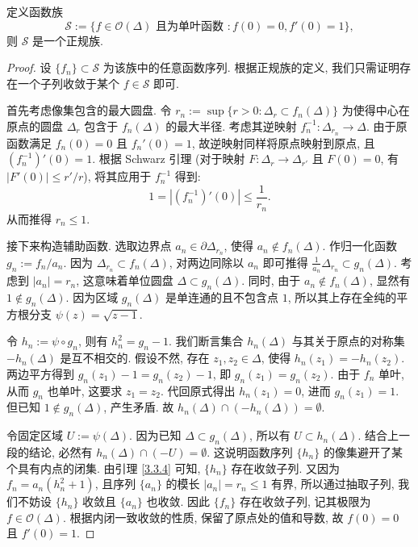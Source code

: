 \begin{lemma}[Kobe 引理]\label{3.3.5}
定义函数族
\[ \mathcal{S} := \{f \in \mathcal{O}(\Delta) \text{ 且为单叶函数 } : f(0)=0, f'(0)=1\}, \]
则 $\mathcal{S}$ 是一个正规族.
\end{lemma}

\begin{proof}
设 $\{f_n\} \subset \mathcal{S}$ 为该族中的任意函数序列. 根据正规族的定义, 我们只需证明存在一个子列收敛于某个 $f \in \mathcal{S}$ 即可. 

首先考虑像集包含的最大圆盘. 令 $r_n := \sup\{r > 0 : \Delta_r \subset f_n(\Delta)\}$ 为使得中心在原点的圆盘 $\Delta_r$ 包含于 $f_n(\Delta)$ 的最大半径. 考虑其逆映射 $f_n^{-1} : \Delta_{r_n} \to \Delta$. 由于原函数满足 $f_n(0)=0$ 且 $f_n'(0)=1$, 故逆映射同样将原点映射到原点, 且 $(f_n^{-1})'(0) = 1$. 根据 Schwarz 引理 (对于映射 $F: \Delta_r \to \Delta_{r'}$ 且 $F(0)=0$, 有 $|F'(0)| \leqslant r'/r$), 将其应用于 $f_n^{-1}$ 得到:
\[ 1 = |(f_n^{-1})'(0)| \leqslant \frac{1}{r_n}. \]
从而推得 $r_n \leqslant 1$.

接下来构造辅助函数. 选取边界点 $a_n \in \partial \Delta_{r_n}$, 使得 $a_n \notin f_n(\Delta)$. 作归一化函数 $g_n := f_n/a_n$. 因为 $\Delta_{r_n} \subset f_n(\Delta)$, 对两边同除以 $a_n$ 即可推得 $\frac{1}{a_n}\Delta_{r_n} \subset g_n(\Delta)$. 考虑到 $|a_n| = r_n$, 这意味着单位圆盘 $\Delta \subset g_n(\Delta)$. 同时, 由于 $a_n \notin f_n(\Delta)$, 显然有 $1 \notin g_n(\Delta)$. 因为区域 $g_n(\Delta)$ 是单连通的且不包含点 $1$, 所以其上存在全纯的平方根分支 $\psi(z) = \sqrt{z-1}$.

令 $h_n := \psi \circ g_n$, 则有 $h_n^2 = g_n - 1$. 我们断言集合 $h_n(\Delta)$ 与其关于原点的对称集 $-h_n(\Delta)$ 是互不相交的. 假设不然, 存在 $z_1, z_2 \in \Delta$, 使得 $h_n(z_1) = -h_n(z_2)$. 两边平方得到 $g_n(z_1) - 1 = g_n(z_2) - 1$, 即 $g_n(z_1) = g_n(z_2)$. 由于 $f_n$ 单叶, 从而 $g_n$ 也单叶, 这要求 $z_1 = z_2$. 代回原式得出 $h_n(z_1) = 0$, 进而 $g_n(z_1) = 1$. 但已知 $1 \notin g_n(\Delta)$, 产生矛盾. 故 $h_n(\Delta) \cap (-h_n(\Delta)) = \emptyset$.

令固定区域 $U := \psi(\Delta)$. 因为已知 $\Delta \subset g_n(\Delta)$, 所以有 $U \subset h_n(\Delta)$. 结合上一段的结论, 必然有 $h_n(\Delta) \cap (-U) = \emptyset$. 这说明函数序列 $\{h_n\}$ 的像集避开了某个具有内点的闭集. 由引理 \ref{3.3.4} 可知, $\{h_n\}$ 存在收敛子列. 又因为 $f_n = a_n(h_n^2+1)$, 且序列 $\{a_n\}$ 的模长 $|a_n| = r_n \leqslant 1$ 有界, 所以通过抽取子列, 我们不妨设 $\{h_n\}$ 收敛且 $\{a_n\}$ 也收敛. 因此 $\{f_n\}$ 存在收敛子列, 记其极限为 $f \in \mathcal{O}(\Delta)$. 根据内闭一致收敛的性质, 保留了原点处的值和导数, 故 $f(0)=0$ 且 $f'(0)=1$.


\end{proof}
